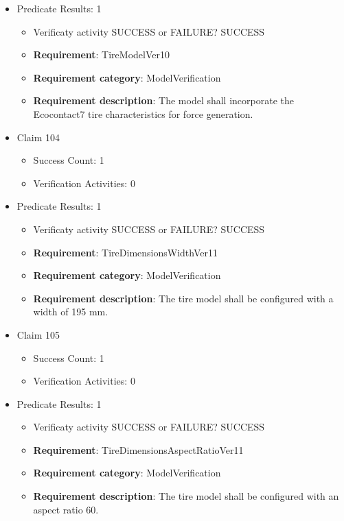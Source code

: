 \documentclass{article}
\begin{document}
\begin{itemize}
									    
				\item Predicate Results: 1
					\begin{itemize}				
					\item Verificaty activity SUCCESS or FAILURE? SUCCESS
					
					\item \textbf{Requirement}: TireModelVer10 
					\item \textbf{Requirement category}: ModelVerification
					\item \textbf{Requirement description}: The model shall incorporate the Ecocontact7 tire characteristics for force generation.
					\end{itemize}

  				  \item Claim 104
				\begin{itemize}
			    	\item Success Count: 1 
			    	\item Verification Activities: 0
				\end{itemize}
				
									    
				\item Predicate Results: 1
					\begin{itemize}				
					\item Verificaty activity SUCCESS or FAILURE? SUCCESS
					
					\item \textbf{Requirement}: TireDimensionsWidthVer11 
					\item \textbf{Requirement category}: ModelVerification
					\item \textbf{Requirement description}: The tire model shall be configured with a width of 195 mm.
					\end{itemize}

  				  \item Claim 105
				\begin{itemize}
			    	\item Success Count: 1 
			    	\item Verification Activities: 0
				\end{itemize}
				
									    
				\item Predicate Results: 1
					\begin{itemize}				
					\item Verificaty activity SUCCESS or FAILURE? SUCCESS
					
					\item \textbf{Requirement}: TireDimensionsAspectRatioVer11 
					\item \textbf{Requirement category}: ModelVerification
					\item \textbf{Requirement description}: The tire model shall be configured with an aspect ratio 60.
					\end{itemize}


\end{itemize}
\end{document}
